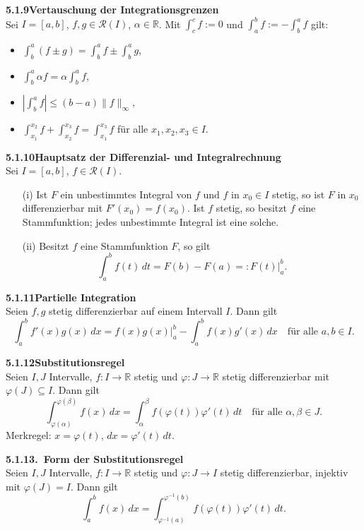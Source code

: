 \documentclass[a4paper,12pt]{article}
\newcommand{\gentry}[3]{%
  \noindent\textbf{#1\quad #2}\nopagebreak\\[0.2em]
  #3\par\smallskip
}
\begin{document}
\gentry{5.1.9}{Vertauschung der Integrationsgrenzen}{%
  Sei $I=[a,b]$, $f, g \in \mathcal{R}(I)$, $\alpha \in \mathbb{R}$. Mit
  $\int_c^c f := 0$ und $\int_a^b f := -\int_b^a f$ gilt:
  \begin{itemize}[topsep=2pt,itemsep=1pt]
    \item $\int_b^a (f \pm g) = \int_b^a f \pm \int_b^a g$,
    \item $\int_b^a \alpha f = \alpha \int_b^a f$,
    \item $\left|\int_b^a f\right| \leq (b-a)\|f\|_\infty$,
    \item $\int_{x_1}^{x_2} f + \int_{x_2}^{x_3} f = \int_{x_1}^{x_3} f$ für alle $x_1, x_2, x_3 \in I$.
  \end{itemize}
}

\gentry{5.1.10}{Hauptsatz der Differenzial- und Integralrechnung}{%
  Sei $I=[a,b]$, $f \in \mathcal{R}(I)$.
  \begin{itemize}[topsep=2pt,itemsep=1pt]
    \item[(i)] Ist $F$ ein unbestimmtes Integral von $f$ und $f$ in $x_0 \in I$ stetig,
      so ist $F$ in $x_0$ differenzierbar mit $F'(x_0) = f(x_0)$. Ist $f$ stetig,
      so besitzt $f$ eine Stammfunktion; jedes unbestimmte Integral ist eine solche.
    \item[(ii)] Besitzt $f$ eine Stammfunktion $F$, so gilt
      \[
        \int_a^b f(t)\,dt = F(b) - F(a) =: F(t)\bigr|_a^b.
      \]
  \end{itemize}
}

\gentry{5.1.11}{Partielle Integration}{%
  Seien $f, g$ stetig differenzierbar auf einem Intervall $I$. Dann gilt
  \[
    \int_a^b f'(x) g(x)\,dx = f(x)g(x)\bigr|_a^b - \int_a^b f(x)g'(x)\,dx
    \quad \text{für alle } a, b \in I.
  \]
}

\gentry{5.1.12}{Substitutionsregel}{%
  Seien $I, J$ Intervalle, $f: I \to \mathbb{R}$ stetig und $\varphi: J \to \mathbb{R}$
  stetig differenzierbar mit $\varphi(J) \subseteq I$. Dann gilt
  \[
    \int_{\varphi(\alpha)}^{\varphi(\beta)} f(x)\,dx = \int_\alpha^\beta f(\varphi(t))\varphi'(t)\,dt
    \quad \text{für alle } \alpha, \beta \in J.
  \]
  Merkregel: $x = \varphi(t)$, $dx = \varphi'(t)\,dt$.
}

\gentry{5.1.13}{2.\ Form der Substitutionsregel}{%
  Seien $I, J$ Intervalle, $f: I \to \mathbb{R}$ stetig und $\varphi: J \to I$
  stetig differenzierbar, injektiv mit $\varphi(J) = I$. Dann gilt
  \[
    \int_a^b f(x)\,dx = \int_{\varphi^{-1}(a)}^{\varphi^{-1}(b)} f(\varphi(t))\varphi'(t)\,dt.
  \]
}
\end{document}
